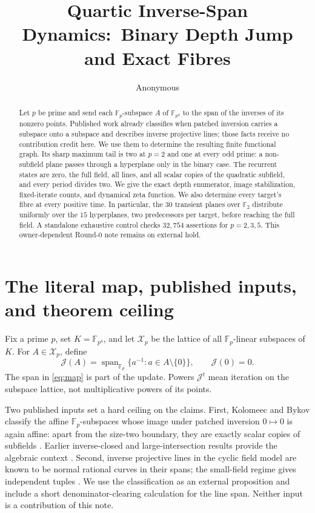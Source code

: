 \documentclass[a4paper,10pt]{amsart}
\title[Quartic inverse-span dynamics]{Quartic Inverse-Span Dynamics:\ Binary Depth Jump and Exact Fibres}
\author{Anonymous}
\date{}
\theoremstyle{remark}
\newcommand{\F}{\mathbb F}
\newcommand{\K}{K}
\newcommand{\X}{\mathcal X}
\newcommand{\J}{\mathcal J}
\newcommand{\Span}{\operatorname{span}}
\begin{document}
\begin{abstract}
Let $p$ be prime and send each $\F_p$-subspace $A$ of
$\F_{p^4}$ to the span of the inverses of its nonzero points.  Published
work already classifies when patched inversion carries a subspace onto a
subspace and describes inverse projective lines; those facts receive no
contribution credit here.  We use them to determine the resulting finite
functional graph.  Its sharp maximum tail is two at $p=2$ and one at every
odd prime: a non-subfield plane passes through a hyperplane only in the
binary case.  The recurrent states are zero, the full field, all lines, and
all scalar copies of the quadratic subfield, and every period divides two.
We give the exact depth enumerator, image stabilization, fixed-iterate counts,
and dynamical zeta function.  We also determine every target's fibre at every
positive time.  In particular, the $30$ transient planes over $\F_2$
distribute uniformly over the $15$ hyperplanes, two predecessors per target,
before reaching the full field.  A standalone exhaustive control checks
$32{,}754$ assertions for $p=2,3,5$.  This owner-dependent Round-0 note
remains on external hold.
\end{abstract}

\maketitle

\section{The literal map, published inputs, and theorem ceiling}

Fix a prime $p$, set $\K=\F_{p^4}$, and let $\X_p$ be the lattice of all
$\F_p$-linear subspaces of $\K$.  For $A\in\X_p$, define
\begin{equation}\label{eq:map}
 \J(A)=\Span_{\F_p}\{a^{-1}:a\in A\setminus\{0\}\},
 \qquad \J(0)=0.
\end{equation}
The span in \eqref{eq:map} is part of the update.  Powers $\J^t$ mean
iteration on the subspace lattice, not multiplicative powers of its points.

Two published inputs set a hard ceiling on the claims.  First,
Kolomeec and Bykov classify the affine $\F_p$-subspaces whose image under
patched inversion $0\mapsto0$ is again affine: apart from the size-two
boundary, they are exactly scalar copies of subfields
\citep{KolomeecBykov2024}.  Earlier inverse-closed and large-intersection
results provide the algebraic context \citep{Mattarei2007,Csajbok2013}.
Second, inverse projective lines in the cyclic field model are known to be
normal rational curves in their spans; the small-field regime gives
independent tuples \citep{FainaEtAl2002,LavrauwZanella2014}.  We use the
classification as an external proposition and include a short
denominator-clearing calculation for the line span.  Neither input is a
contribution of this note.
\end{document}
